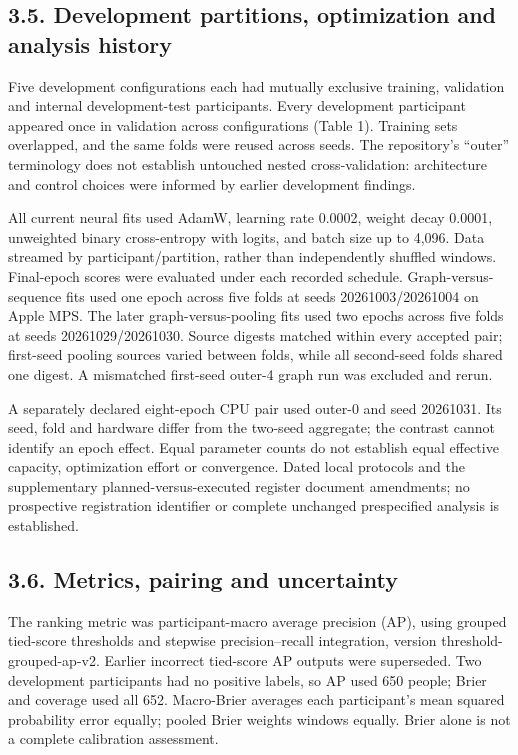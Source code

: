 \documentclass[11pt,a4paper]{article}
\begin{document}
\subsection*{3.5. Development partitions, optimization and analysis history}
Five development configurations each had mutually exclusive training, validation and internal development-test participants. Every development participant appeared once in validation across configurations (Table 1). Training sets overlapped, and the same folds were reused across seeds. The repository's “outer” terminology does not establish untouched nested cross-validation: architecture and control choices were informed by earlier development findings.

All current neural fits used AdamW, learning rate 0.0002, weight decay 0.0001, unweighted binary cross-entropy with logits, and batch size up to 4,096. Data streamed by participant/partition, rather than independently shuffled windows. Final-epoch scores were evaluated under each recorded schedule. Graph-versus-sequence fits used one epoch across five folds at seeds 20261003/20261004 on Apple MPS. The later graph-versus-pooling fits used two epochs across five folds at seeds 20261029/20261030. Source digests matched within every accepted pair; first-seed pooling sources varied between folds, while all second-seed folds shared one digest. A mismatched first-seed outer-4 graph run was excluded and rerun.

A separately declared eight-epoch CPU pair used outer-0 and seed 20261031. Its seed, fold and hardware differ from the two-seed aggregate; the contrast cannot identify an epoch effect. Equal parameter counts do not establish equal effective capacity, optimization effort or convergence. Dated local protocols and the supplementary planned-versus-executed register document amendments; no prospective registration identifier or complete unchanged prespecified analysis is established.

\subsection*{3.6. Metrics, pairing and uncertainty}
The ranking metric was participant-macro average precision (AP), using grouped tied-score thresholds and stepwise precision--recall integration, version threshold-grouped-ap-v2. Earlier incorrect tied-score AP outputs were superseded. Two development participants had no positive labels, so AP used 650 people; Brier and coverage used all 652. Macro-Brier averages each participant's mean squared probability error equally; pooled Brier weights windows equally. Brier alone is not a complete calibration assessment.
\end{document}
